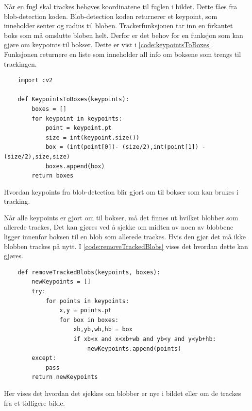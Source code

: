 Når en fugl skal trackes behøves koordinatene til fuglen i bildet. Dette fåes fra blob-detection koden. Blob-detection koden returnerer et keypoint, som inneholder senter og radius til bloben. Trackerfunksjonen tar inn en firkantet boks som må omslutte bloben helt. Derfor er det behov for en funksjon som kan gjøre om keypoints til bokser. Dette er vist i \autoref{code:keypointsToBoxes}. Funksjonen returnere en liste som inneholder all info om boksene som trengs til trackingen.
\begin{code}
\begin{verbatim}
    import cv2
    
    def KeypointsToBoxes(keypoints):
        boxes = []
        for keypoint in keypoints:
            point = keypoint.pt
            size = int(keypoint.size())
            box = (int(point[0])- (size/2),int(point[1]) - (size/2),size,size)
            boxes.append(box)
        return boxes
\end{verbatim}
\caption{Hvordan keypoints fra blob-detection blir gjort om til bokser som kan brukes i tracking.}
\label{code:keypointsToBoxes}
\end{code}

Når alle keypoints er gjort om til bokser, må det finnes ut hvilket blobber som allerede trackes, Det kan gjøres ved å sjekke om midten av noen av blobbene ligger innenfor boksen til en blob som allerede trackes. Hvis den gjør det må ikke blobben trackes på nytt. I \autoref{code:removeTrackedBlobs} vises det hvordan dette kan gjøres.

\begin{code}
\begin{verbatim}
    def removeTrackedBlobs(keypoints, boxes):
        newKeypoints = []
        try:
            for points in keypoints:
                x,y = points.pt
                for box in boxes:
                    xb,yb,wb,hb = box
                    if xb<x and x<xb+wb and yb<y and y<yb+hb:
                        newKeypoints.append(points)
        except:
            pass
        return newKeypoints
\end{verbatim}
\caption{Her vises det hvordan det sjekkes om blobber er nye i bildet eller om de trackes fra et tidligere bilde.}
\label{code:removeTrackedBlobs}
\end{code}

